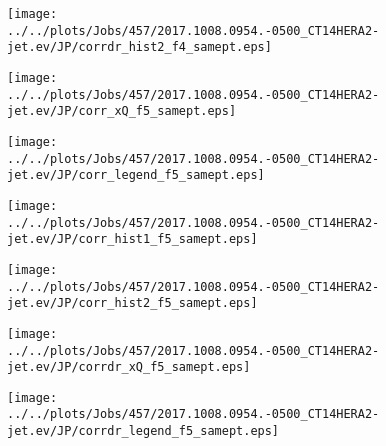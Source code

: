 \documentclass[12pt]{article}
\begin{document}
\begin{figure}
\texttt{[image: ../../plots/Jobs/457/2017.1008.0954.-0500\_CT14HERA2-jet.ev/JP/corrdr\_hist2\_f4\_samept.eps]}
\caption{}
\end{figure}\newpage\clearpage
\begin{figure}
\texttt{[image: ../../plots/Jobs/457/2017.1008.0954.-0500\_CT14HERA2-jet.ev/JP/corr\_xQ\_f5\_samept.eps]}
\caption{}
\end{figure}\newpage\clearpage
\begin{figure}
\texttt{[image: ../../plots/Jobs/457/2017.1008.0954.-0500\_CT14HERA2-jet.ev/JP/corr\_legend\_f5\_samept.eps]}
\caption{}
\end{figure}\newpage\clearpage
\begin{figure}
\texttt{[image: ../../plots/Jobs/457/2017.1008.0954.-0500\_CT14HERA2-jet.ev/JP/corr\_hist1\_f5\_samept.eps]}
\caption{}
\end{figure}\newpage\clearpage
\begin{figure}
\texttt{[image: ../../plots/Jobs/457/2017.1008.0954.-0500\_CT14HERA2-jet.ev/JP/corr\_hist2\_f5\_samept.eps]}
\caption{}
\end{figure}\newpage\clearpage
\begin{figure}
\texttt{[image: ../../plots/Jobs/457/2017.1008.0954.-0500\_CT14HERA2-jet.ev/JP/corrdr\_xQ\_f5\_samept.eps]}
\caption{}
\end{figure}\newpage\clearpage
\begin{figure}
\texttt{[image: ../../plots/Jobs/457/2017.1008.0954.-0500\_CT14HERA2-jet.ev/JP/corrdr\_legend\_f5\_samept.eps]}
\caption{}
\end{figure}\newpage\clearpage
\end{document}
